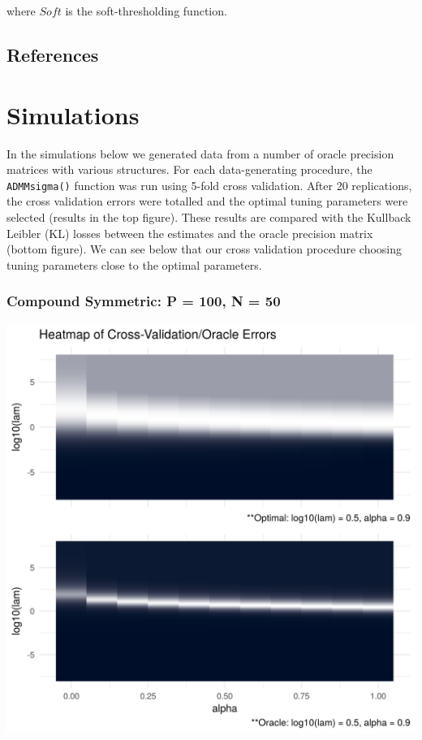 \documentclass[12pt,]{book}
\theoremstyle{definition}
\theoremstyle{definition}
\theoremstyle{definition}
\theoremstyle{remark}
\begin{document}
where \(Soft\) is the soft-thresholding function.

\newpage

\hypertarget{references}{%
\section{References}\label{references}}

\hypertarget{simulations}{%
\chapter{Simulations}\label{simulations}}

In the simulations below we generated data from a number of oracle
precision matrices with various structures. For each data-generating
procedure, the \texttt{ADMMsigma()} function was run using 5-fold cross
validation. After 20 replications, the cross validation errors were
totalled and the optimal tuning parameters were selected (results in the
top figure). These results are compared with the Kullback Leibler (KL)
losses between the estimates and the oracle precision matrix (bottom
figure). We can see below that our cross validation procedure choosing
tuning parameters close to the optimal parameters.

\newpage

\hypertarget{compound-symmetric-p-100-n-50}{%
\subsection{Compound Symmetric: P = 100, N =
50}\label{compound-symmetric-p-100-n-50}}

\includegraphics{images/compound_N50_P100.png}
\end{document}
